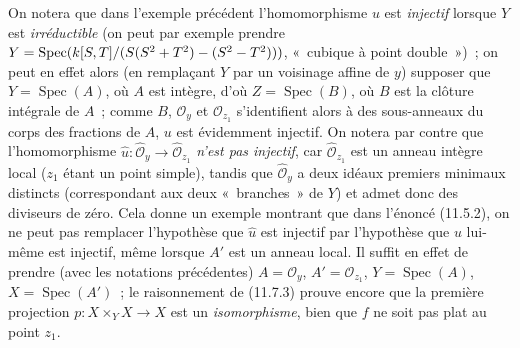 \begin{env}[11.7.4]
\label{IV.11.7.4-fr}
On notera que dans l'exemple précédent l'homomorphisme $u$ est \emph{injectif}
lorsque $Y$ est \emph{irréductible} (on peut par exemple prendre
$Y=\operatorname{Spec}(k[S,T]/(S(S^2+T^2)-(S^2- T^2)))$, «~cubique à point
double~»)~; on peut en effet alors (en remplaçant $Y$ par un voisinage affine de
$y$) supposer que $Y=\operatorname{Spec}(A)$, où $A$ est intègre, d'où
$Z=\operatorname{Spec}(B)$, où $B$ est la clôture intégrale de $A$~; comme $B$,
$\mathcal O_y$ et $\mathcal O_{z_1}$ s'identifient alors à des sous-anneaux du
corps
des fractions de $A$, $u$ est évidemment injectif. On notera par contre que
l'homomorphisme $\widehat u:\widehat{\mathcal O}_y\to
\widehat{\mathcal O}_{z_1}$ \emph{n'est pas injectif}, car
$\widehat{\mathcal O}_{z_1}$ est un anneau intègre local ($z_1$ étant un point
simple), tandis que $\widehat{\mathcal O}_y$ a deux idéaux premiers minimaux
distincts (correspondant aux deux «~branches~» de $Y$) et admet donc des
diviseurs de zéro. Cela donne un exemple montrant que dans l'énoncé (11.5.2), on
ne peut pas remplacer l'hypothèse que $\widehat u$ est injectif par l'hypothèse
que $u$ lui-même est injectif, même lorsque $A'$ est un anneau local. Il suffit
en effet de prendre (avec les notations précédentes) $A=\mathcal O_y$,
$A'=\mathcal O_{z_1}$, $Y=\operatorname{Spec}(A)$,
$X=\operatorname{Spec}(A')$~; le raisonnement de (11.7.3) prouve encore que la
première projection $p:X\times_Y X\to X$ est un \emph{isomorphisme}, bien que $f$ ne
soit pas plat au point $z_1$.
\end{env}

